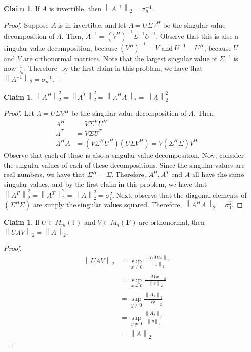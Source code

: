 \documentclass[letterpaper,12pt]{article}
\theoremstyle{definition}
\newtheorem{claim}[theorem]{Claim}
\newcommand{\norm}[1]{\left\lVert#1\right\rVert}
\begin{document}
\begin{claim}
	If $A$ is invertible, then $\norm{A^{-1}}_2 = \sigma^{-1}_n$.
\end{claim}
\begin{proof}
	Suppose $A$ is in invertible, and let $A = U \Sigma V^H$ be the singular value decomposition of $A$. Then, $A^{-1} = (V^H)^{-1} \Sigma^{-1} U^{-1}$. Observe that this is also a singular value decomposition, because $(V^H)^{-1} = V$ and $U^{-1} = U^H$, because $U$ and $V$ are orthonormal matrices. Note that the largest singular value of $\Sigma^{-1}$ is now $\frac{1}{\sigma_n}$. Therefore, by the first claim in this problem, we have that  $\norm{A^{-1}}_2 = \sigma^{-1}_n$.
\end{proof}

\begin{claim}
	$\norm{A^H}^2_2 = \norm{A^T}^2_2 = \norm{A^H A}_2 = \norm{A}^2_2$
\end{claim}
\begin{proof}
	Let $A = U \Sigma V^H$ be the singular value decomposition of $A$. Then,
	\begin{align*}
	A^H &= V \Sigma^H U^H \\
	A^T &= \overline{V} \Sigma U^T \\
	A^H A &= (V \Sigma^H U^H) (U \Sigma V^H) = V (\Sigma^H \Sigma) V^H 
	\end{align*}
	Observe that each of these is also a singular value decomposition. Now, consider the singular values of each of these decompositions. Since the singular values are real numbers, we have that $\Sigma^H = \Sigma$. Therefore, $A^H, A^T$ and $A$ all have the same singular values, and by the first claim in this problem, we have that $\norm{A^H}^2_2 = \norm{A^T}^2_2 =  \norm{A}^2_2 = \sigma^2_1$. Next, observe that the diagonal elements of $(\Sigma^H \Sigma)$ are simply the singular values squared. Therefore, $\norm{A^H A}_2  = \sigma^2_1$. 
\end{proof}

\begin{claim}
	If $U \in M_m(\mathbb{F})$ and $V \in M_n(\mathbf{F})$ are orthonormal, then $\norm{UAV}_2 = \norm{A}_2$. 
\end{claim}
\begin{proof}
	\begin{align*}
	\norm{UAV}_2 &= \sup_{x\neq 0} \frac{\norm{UAVx}_2}{\norm{x}_2} \\
	&= \sup_{x\neq 0} \frac{\norm{AVx}_2}{\norm{x}_2} \tag{because $U$ orthonormal}\\ 
	&= \sup_{y\neq 0} \frac{\norm{Ay}_2}{\norm{Vy}_2} \tag{change of variables}\\
	&=  \sup_{y\neq 0} \frac{\norm{Ay}_2}{\norm{y}_2} \tag{because $V$ orthonormal} \\
	&= \norm{A}_2
	\end{align*}
\end{proof}
\end{document}
